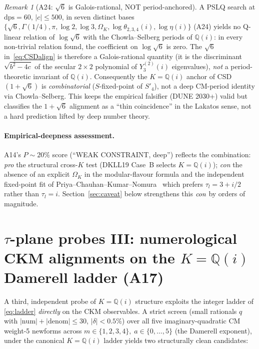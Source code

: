 \documentclass[a4paper,11pt]{article}
\newcommand{\Spf}{S'_4}
\newcommand{\OmK}{\Omega_K}
\newcommand{\Qi}{\mathbb{Q}(i)}
\theoremstyle{definition}
\theoremstyle{remark}
\newtheorem{remark}[theorem]{Remark}
\begin{document}
\begin{remark}[A24: $\sqrt{6}$ is Galois-rational, NOT period-anchored]
\label{rem:A24}
A PSLQ search at $\mathrm{dps}=60$, $|c|\le 500$, in seven distinct
bases $\{\sqrt 6,\Gamma(1/4),\pi,\log 2,\log 3,\OmK,
\log\theta_{2,3,4}(i),\log\eta(i)\}$ (A24) yields no Q-linear relation
of $\log\sqrt 6$ with the Chowla--Selberg periods of $\Qi$: in every
non-trivial relation found, the coefficient on $\log\sqrt 6$ is zero.
The $\sqrt 6$ in~\eqref{eq:CSDalign} is therefore a Galois-rational
quantity (it is the discriminant $\sqrt{b^2-4c}$ of the secular
$2\times 2$ polynomial of $Y_3^{(2)}(i)$ eigenvalues), \emph{not} a
period-theoretic invariant of $\Qi$.  Consequently the $K=\Qi$ anchor
of CSD$(1+\sqrt 6)$ is \emph{combinatorial} ($S$-fixed-point of
$\Spf$), not a deep CM-period identity via Chowla--Selberg.  This
keeps the empirical falsifier (DUNE 2030+) valid but classifies the
$1+\sqrt 6$ alignment as a ``thin coincidence'' in the Lakatos sense,
not a hard prediction lifted by deep number theory.
\end{remark}

\paragraph{Empirical-deepness assessment.}
A14's $P\sim 20\%$ score (``WEAK CONSTRAINT, deep'') reflects the
combination: \emph{pro} the structural cross-$K$ test (DKLL19 Case~B
selects $K=\Qi$); \emph{con} the absence of an explicit
$\OmK$ in the modular-flavour formula and the independent fixed-point
fit of Priya--Chauhan--Kumar--Nomura~\cite{Priya26} which prefers
$\tau_l=3+i/2$ rather than $\tau_l=i$.  Section~\ref{sec:caveat} below
strengthens this $\emph{con}$ by orders of magnitude.

\section{$\tau$-plane probes III: numerological CKM alignments
         on the $K=\Qi$ Damerell ladder (A17)}
\label{sec:CKM}

A third, independent probe of $K=\Qi$ structure exploits the integer
ladder of \eqref{eq:ladder} \emph{directly} on the CKM observables.
A strict screen (small rationals $q$ with $|\mathrm{num}|+
|\mathrm{denom}|\le 30$, $|\delta|<0.5\%$) over all five
imaginary-quadratic CM weight-5 newforms across
$m\in\{1,2,3,4\},\;a\in\{0,\ldots,5\}$ (the Damerell exponent),
under the canonical $K=\Qi$ ladder yields two structurally clean
candidates:
\end{document}
